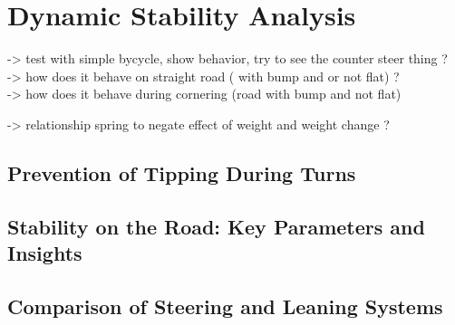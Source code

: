 \section{Dynamic Stability Analysis}

-> test with simple bycycle, show behavior, try to see the counter steer thing ?\\

-> how does it behave on straight road ( with bump and or not flat) ?\\

-> how does it behave during cornering (road with bump and not flat)

-> relationship spring to negate effect of weight and weight change ?\\

\subsection{Prevention of Tipping During Turns}

\subsection{Stability on the Road: Key Parameters and Insights}

\subsection{Comparison of Steering and Leaning Systems}